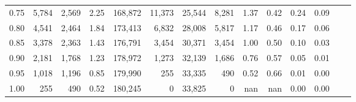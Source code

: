 \begin{tabular}{rrrrrrrrrrrrrr}
0.75 &   5,784 &  2,569 &    2.25 &  168,872 &   11,373 &  25,544 &   8,281 &  1.37 &  0.42 &  0.24 &      0.09 \\
0.80 &   4,541 &  2,464 &    1.84 &  173,413 &    6,832 &  28,008 &   5,817 &  1.17 &  0.46 &  0.17 &      0.06 \\
0.85 &   3,378 &  2,363 &    1.43 &  176,791 &    3,454 &  30,371 &   3,454 &  1.00 &  0.50 &  0.10 &      0.03 \\
0.90 &   2,181 &  1,768 &    1.23 &  178,972 &    1,273 &  32,139 &   1,686 &  0.76 &  0.57 &  0.05 &      0.01 \\
0.95 &   1,018 &  1,196 &    0.85 &  179,990 &      255 &  33,335 &     490 &  0.52 &  0.66 &  0.01 &      0.00 \\
1.00 &     255 &    490 &    0.52 &  180,245 &        0 &  33,825 &       0 &   nan &   nan &  0.00 &      0.00 \\
\bottomrule
\end{tabular}
